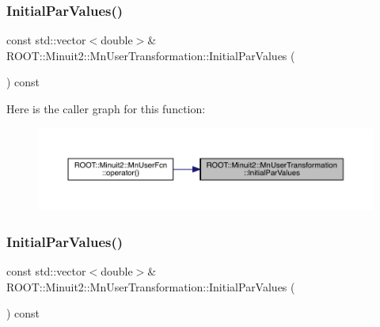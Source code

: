 \subsubsection{\texorpdfstring{InitialParValues()}{InitialParValues()}\hspace{0.1cm}{\footnotesize\ttfamily [1/3]}}
{\footnotesize\ttfamily const std\+::vector$<$double$>$\& R\+O\+O\+T\+::\+Minuit2\+::\+Mn\+User\+Transformation\+::\+Initial\+Par\+Values (\begin{DoxyParamCaption}{ }\end{DoxyParamCaption}) const\hspace{0.3cm}{\ttfamily [inline]}}

Here is the caller graph for this function\+:
\nopagebreak
\begin{figure}[H]
\begin{center}
\leavevmode
\includegraphics[width=350pt]{d9/d98/classROOT_1_1Minuit2_1_1MnUserTransformation_a30432dec33ea27b75059a6ce28dfd5cd_icgraph}
\end{center}
\end{figure}
\mbox{\label{classROOT_1_1Minuit2_1_1MnUserTransformation_a30432dec33ea27b75059a6ce28dfd5cd}} 
\subsubsection{\texorpdfstring{InitialParValues()}{InitialParValues()}\hspace{0.1cm}{\footnotesize\ttfamily [2/3]}}
{\footnotesize\ttfamily const std\+::vector$<$double$>$\& R\+O\+O\+T\+::\+Minuit2\+::\+Mn\+User\+Transformation\+::\+Initial\+Par\+Values (\begin{DoxyParamCaption}{ }\end{DoxyParamCaption}) const\hspace{0.3cm}{\ttfamily [inline]}}

\mbox{\label{classROOT_1_1Minuit2_1_1MnUserTransformation_a30432dec33ea27b75059a6ce28dfd5cd}} 
